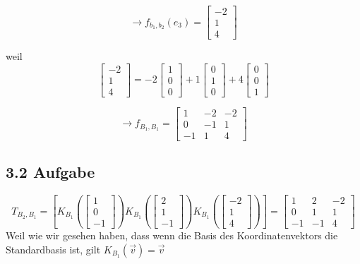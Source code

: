 \documentclass{report}
\begin{document}
\begin{enumerate}
        $$\rightarrow f_{b_1,b_2}(e_3) = \begin{bmatrix}
           -2 \\
            1 \\ 
            4 
        \end{bmatrix} $$

        weil 
        \[
           \begin{bmatrix}
           -2 \\
            1 \\
            4 
           \end{bmatrix} = -2 
           \begin{bmatrix}
              1 \\
              0 \\
              0
           \end{bmatrix}   +1 
           \begin{bmatrix}
              0 \\
              1 \\
              0
           \end{bmatrix}   +4 
           \begin{bmatrix}
              0 \\
              0 \\
              1
           \end{bmatrix}    
        \] 

\end{enumerate}
\[ \rightarrow f_{B_1, B_1} =
   \begin{bmatrix}
       1 & -2 & -2 \\
       0 & -1 & 1 \\
       -1 & 1 & 4
   \end{bmatrix} 
\]
\subsection*{3.2 Aufgabe}
\[
    T_{B_2,B_1} = \left\lbrack K_{B_1}(\begin{bmatrix}
        1 \\
        0 \\
        -1
    \end{bmatrix}) K_{B_1}(\begin{bmatrix}
        2 \\ 
        1 \\
        -1
    \end{bmatrix}) K_{B_1}(\begin{bmatrix}
        -2 \\
        1 \\
        4
    \end{bmatrix})\right\rbrack = \begin{bmatrix}
    1 & 2 & -2 \\
    0 & 1 & 1 \\
    -1 & -1 & 4
    \end{bmatrix}
\] 
Weil wie wir gesehen haben, dass wenn die Basis des Koordinatenvektors
die Standardbasis ist, gilt $K_{B_1}(\vec{v})=\vec{v}$
\end{document}
